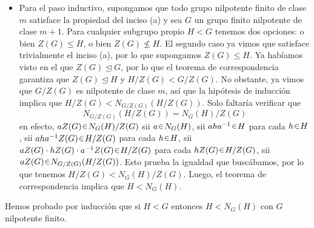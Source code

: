 \begin{sol}[Demostración]
\begin{enumerate}[label = (\alph*)]
\begin{itemize}
    \item Para el paso inductivo, supongamos que todo grupo nilpotente finito de clase $m$ satisface la propiedad del inciso (a) y sea $G$ un grupo finito nilpotente de clase $m+1$. Para cualquier subgrupo propio $H < G$ tenemos dos opciones: o bien $Z(G) \leq H$, o bien $Z(G) \nleq H$. El segundo caso ya vimos que satisface trivialmente el inciso (a), por lo que supongamos $Z(G) \leq H$. Ya habíamos visto en el  que $Z(G) \trianglelefteq G$, por lo que el teorema de correspondencia garantiza que $Z(G) \trianglelefteq H$ y $H / Z(G) < G / Z(G)$. No obstante, ya vimos que $G/Z(G)$ es nilpotente de clase $m$, así que la hipótesis de inducción implica que $H/Z(G) < N_{G/Z(G)}(H/Z(G))$. Solo faltaría verificar que
    \[
    N_{G/Z(G)}(H/Z(G)) = N_G(H) / Z(G)
    \]
    en efecto, $aZ(G) \en N_G(H)/Z(G)$ sii $a \en N_G(H)$, sii $aha^{-1} \en H$ para cada $h \en H$, sii $aha^{-1}Z(G) \en H/Z(G)$ para cada $h \en H$, sii $aZ(G)\cdot hZ(G) \cdot a^{-1}Z(G) \en H/Z(G)$ para cada $hZ(G) \en H/Z(G)$, sii $aZ(G) \en N_{G/Z(G)}(H/Z(G))$. Esto prueba la igualdad que buscábamos, por lo que tenemos $H/Z(G) < N_G(H)/Z(G)$. Luego, el teorema de correspondencia implica que $H < N_G(H)$.
    \end{itemize}
    Hemos probado por inducción que si $H < G$ entonces $H<N_G(H)$ con $G$ nilpotente finito.


\end{enumerate}
\end{sol}
